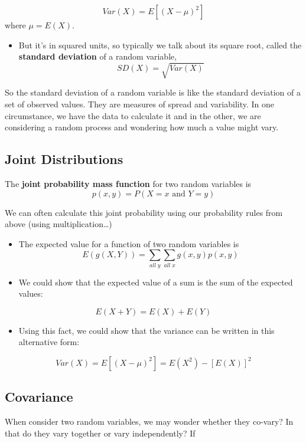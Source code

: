 \documentclass[
]{book}
\providecommand{\tightlist}{%
  \setlength{\itemsep}{0pt}\setlength{\parskip}{0pt}}
\begin{document}
\[Var(X) = E[(X-\mu)^2]\]
where \(\mu = E(X)\).

\begin{itemize}
\tightlist
\item
  But it's in squared units, so typically we talk about its square root, called the \textbf{standard deviation} of a random variable,
  \[SD(X) = \sqrt{Var(X)}\]
\end{itemize}

So the standard deviation of a random variable is like the standard deviation of a set of observed values. They are measures of spread and variability. In one circumstance, we have the data to calculate it and in the other, we are considering a random process and wondering how much a value might vary.

\hypertarget{joint-distributions}{%
\subsection{Joint Distributions}\label{joint-distributions}}

The \textbf{joint probability mass function} for two random variables is
\[p(x,y) = P(X=x \text{ and }Y = y)\]

We can often calculate this joint probability using our probability rules from above (using multiplication\ldots)

\begin{itemize}
\item
  The expected value for a function of two random variables is
  \[E(g(X,Y)) = \sum_{all\; y}\sum_{all\; x} g(x,y)p(x,y)\]
\item
  We could show that the expected value of a sum is the sum of the expected values:
\end{itemize}

\[E(X+Y) = E(X) + E(Y)\]

\begin{itemize}
\tightlist
\item
  Using this fact, we could show that the variance can be written in this alternative form:
\end{itemize}

\[Var(X) = E[(X-\mu)^2] = E(X^2) - [E(X)]^2\]

\hypertarget{covariance}{%
\subsection{Covariance}\label{covariance}}

When consider two random variables, we may wonder whether they co-vary? In that do they vary together or vary independently? If
\end{document}
